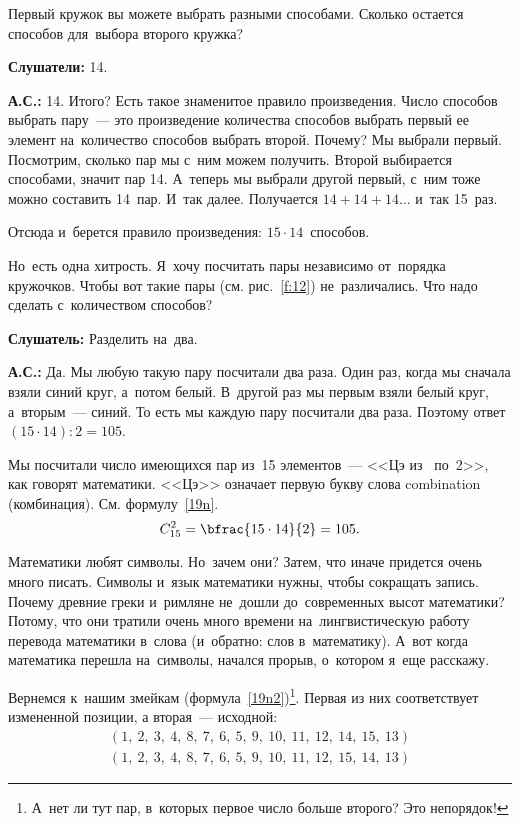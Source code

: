 Первый кружок вы можете выбрать  разными способами. Сколько остается способов для~выбора
второго кружка?

\textbf{Слушатели:} 14.

\textbf{А.С.:} 14. Итого? Есть такое знаменитое правило произведения. Число способов выбрать
пару~--- это произведение количества способов выбрать первый ее элемент на~количество способов выбрать второй.
Почему? Мы выбрали первый. Посмотрим, сколько пар мы с~ним можем получить. Второй выбирается 
способами, значит пар 14. А~теперь мы выбрали другой первый, с~ним тоже можно составить 14~пар.
И~так далее. Получается $14 + 14 + 14\ldots$ и~так 15~раз.

Отсюда и~берется правило произведения: $15\cdot 14$~способов.

Но~есть одна хитрость. Я~хочу посчитать пары независимо от~порядка кружочков. Чтобы вот такие пары (см. рис.~\ref{f:12}) не~различались.
Что надо сделать с~количеством способов?


\textbf{Слушатель:} Разделить на~два.

\textbf{А.С.:} Да. Мы любую такую пару посчитали два раза. Один раз, когда мы сначала взяли синий
круг, а~потом белый. В~другой раз мы первым взяли белый круг, а~вторым~--- синий. То есть мы каждую пару посчитали два раза.
Поэтому ответ $(15\cdot 14):2 = 105$.


Мы посчитали число имеющихся пар из~15 элементов~--- <<Цэ из~ по~2>>, как говорят математики.
<<Цэ>> означает первую букву слова combination (комбинация). См. формулу~\eqref{19n}.
\begin{equation} %
\label{19n}
C_{15}^{2}=\bfrac{15\cdot 14}{2}=105.
\end{equation}

Математики любят символы. Но~зачем они? Затем, что иначе придется очень много писать. Символы
и~язык математики нужны, чтобы сокращать запись. Почему древние греки и~римляне не~дошли
до~современных высот математики? Потому, что они тратили очень много времени на~лингвистическую
работу перевода математики в~слова (и~обратно: слов в~математику).
А~вот когда математика перешла
на~символы, начался прорыв, о~котором я~еще расскажу.

Вернемся к~нашим змейкам (формула~\eqref{19n2})\footnote{А~нет ли тут пар, в~которых первое число больше второго? Это непорядок!}.
Первая из них соответствует измененной позиции, а вторая~--- исходной:
\begin{equation} %
\label{19n2}
\begin{gathered}
(1,\ 2,\ 3,\ 4,\ 8,\ 7,\ 6,\ 5,\ 9,\ 10,\ 11,\ 12,\ 14,\ 15,\ 13)\\
(1,\ 2,\ 3,\ 4,\ 8,\ 7,\ 6,\ 5,\ 9,\ 10,\ 11,\ 12,\ 15,\ 14,\ 13)
\end{gathered}
\end{equation}
%


